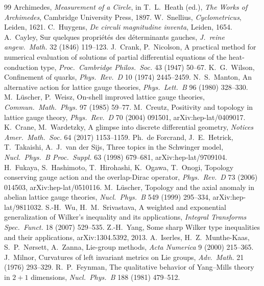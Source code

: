 \begin{thebibliography}{99}\small
{} Archimedes, \emph{Measurement of a Circle}, in T.~L.~Heath (ed.), \emph{The Works of Archimedes}, Cambridge University Press, 1897.
 W.~Snellius, \emph{Cyclometricus}, Leiden, 1621.
 C.~Huygens, \emph{De circuli magnitudine inventa}, Leiden, 1654.
 A.~Cayley, Sur quelques propri\'et\'es des d\'eterminants gauches, \emph{J.\ reine angew.\ Math.} 32 (1846) 119--123.
 J.~Crank, P.~Nicolson, A practical method for numerical evaluation of solutions of partial differential equations of the heat-conduction type, \emph{Proc.\ Cambridge Philos.\ Soc.} 43 (1947) 50--67.
 K.~G.~Wilson, Confinement of quarks, \emph{Phys.\ Rev.\ D} 10 (1974) 2445--2459.
 N.~S.~Manton, An alternative action for lattice gauge theories, \emph{Phys.\ Lett.\ B} 96 (1980) 328--330.
 M.~L\"uscher, P.~Weisz, On-shell improved lattice gauge theories, \emph{Commun.\ Math.\ Phys.} 97 (1985) 59--77.
 M.~Creutz, Positivity and topology in lattice gauge theory, \emph{Phys.\ Rev.\ D} 70 (2004) 091501, arXiv:hep-lat/0409017.
 K.~Crane, M.~Wardetzky, A glimpse into discrete differential geometry, \emph{Notices Amer.\ Math.\ Soc.} 64 (2017) 1153--1159.
 Ph.~de Forcrand, J.~E.~Hetrick, T.~Takaishi, A.~J.~van der Sijs, Three topics in the Schwinger model, \emph{Nucl.\ Phys.\ B Proc.\ Suppl.} 63 (1998) 679--681, arXiv:hep-lat/9709104.
 H.~Fukaya, S.~Hashimoto, T.~Hirohashi, K.~Ogawa, T.~Onogi, Topology conserving gauge action and the overlap-Dirac operator, \emph{Phys.\ Rev.\ D} 73 (2006) 014503, arXiv:hep-lat/0510116.
 M.~L\"uscher, Topology and the axial anomaly in abelian lattice gauge theories, \emph{Nucl.\ Phys.\ B} 549 (1999) 295--334, arXiv:hep-lat/9811032.
 S.-H.~Wu, H.~M.~Srivastava, A weighted and exponential generalization of Wilker's inequality and its applications, \emph{Integral Transforms Spec.\ Funct.} 18 (2007) 529--535.
 Z.-H.~Yang, Some sharp Wilker type inequalities and their applications, arXiv:1304.5392, 2013.
 A.~Iserles, H.~Z.~Munthe-Kaas, S.~P.~N{\o}rsett, A.~Zanna, Lie-group methods, \emph{Acta Numerica} 9 (2000) 215--365.
 J.~Milnor, Curvatures of left invariant metrics on Lie groups, \emph{Adv.\ Math.} 21 (1976) 293--329.
 R.~P.~Feynman, The qualitative behavior of Yang--Mills theory in $2+1$ dimensions, \emph{Nucl.\ Phys.\ B} 188 (1981) 479--512.

\end{thebibliography}

